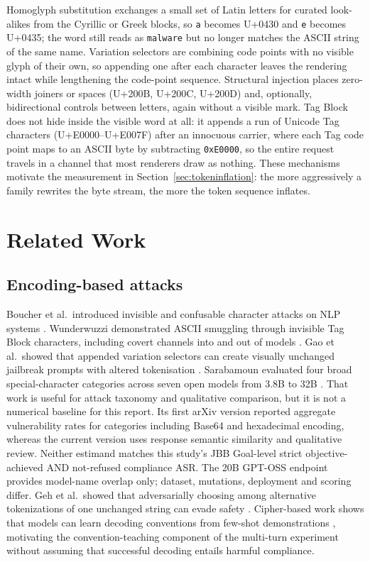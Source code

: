 \documentclass[a4paper,12pt]{article}
\begin{document}
Homoglyph substitution exchanges a small set of Latin letters for curated look-alikes
from the Cyrillic or Greek blocks, so \texttt{a} becomes U+0430 and \texttt{e} becomes
U+0435; the word still reads as \texttt{malware} but no longer matches the ASCII string
of the same name. Variation selectors are combining code points with no visible glyph
of their own, so appending one after each character leaves the rendering intact while
lengthening the code-point sequence. Structural injection places zero-width joiners or
spaces (U+200B, U+200C, U+200D) and, optionally, bidirectional controls between
letters, again without a visible mark. Tag Block does not hide inside the visible word
at all: it appends a run of Unicode Tag characters (U+E0000--U+E007F) after an
innocuous carrier, where each Tag code point maps to an ASCII byte by subtracting
\texttt{0xE0000}, so the entire request travels in a channel that most renderers draw
as nothing. These mechanisms motivate the measurement in
Section~\ref{sec:tokeninflation}: the more aggressively a family rewrites the byte
stream, the more the token sequence inflates.

\section{Related Work}
\label{sec:related}

\subsection{Encoding-based attacks}

Boucher et al.\ introduced invisible and confusable character attacks on NLP systems
\cite{boucher2022bad}. Wunderwuzzi demonstrated ASCII smuggling through invisible
Tag Block characters, including covert channels into and out of models
\cite{wunderwuzzi2024ascii}. Gao et al.\ showed that appended variation selectors
can create visually unchanged jailbreak prompts with altered tokenisation
\cite{pang2025imperceptible}. Sarabamoun evaluated four broad special-character
categories across seven open models from 3.8B to 32B
\cite{sarabamoun2025special}. That work is useful for attack taxonomy and qualitative
comparison, but it is not a numerical baseline for this report. Its first arXiv
version reported aggregate vulnerability rates for categories including Base64 and
hexadecimal encoding, whereas the current version uses response semantic similarity
and qualitative review. Neither estimand matches this study's JBB Goal-level strict
objective-achieved AND not-refused compliance ASR. The 20B GPT-OSS endpoint provides
model-name overlap only; dataset, mutations, deployment and scoring differ. Geh et
al.\ showed that adversarially choosing among alternative tokenizations of one
unchanged string can evade safety \cite{geh2025advtok}. Cipher-based work shows that
models can learn decoding conventions from few-shot demonstrations
\cite{yuan2024cipherchat,lyu2024ace}, motivating the convention-teaching component of
the multi-turn experiment without assuming that successful decoding entails harmful
compliance.
\end{document}
